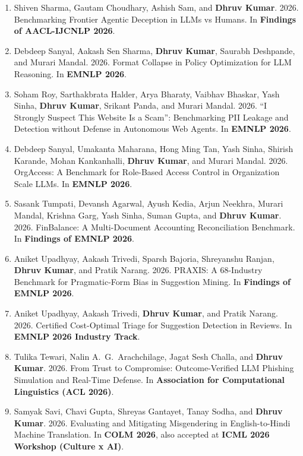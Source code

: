 \documentclass[10pt, a4paper]{article}
\begin{document}
\begin{enumerate}[label=\textbf{C\arabic*.}, leftmargin=2.8em, itemsep=0.3em]
\item Shiven Sharma, Gautam Choudhary, Ashish Sam, and \textbf{Dhruv Kumar}. 2026. Benchmarking Frontier Agentic Deception in LLMs vs Humans. In \textbf{Findings of AACL-IJCNLP 2026}.

\item Debdeep Sanyal, Aakash Sen Sharma, \textbf{Dhruv Kumar}, Saurabh Deshpande, and Murari Mandal. 2026. Format Collapse in Policy Optimization for LLM Reasoning. In \textbf{EMNLP 2026}.

\item Soham Roy, Sarthakbrata Halder, Arya Bharaty, Vaibhav Bhaskar, Yash Sinha, \textbf{Dhruv Kumar}, Srikant Panda, and Murari Mandal. 2026. ``I Strongly Suspect This Website Is a Scam'': Benchmarking PII Leakage and Detection without Defense in Autonomous Web Agents. In \textbf{EMNLP 2026}.

\item Debdeep Sanyal, Umakanta Maharana, Hong Ming Tan, Yash Sinha, Shirish Karande, Mohan Kankanhalli, \textbf{Dhruv Kumar}, and Murari Mandal. 2026. OrgAccess: A Benchmark for Role-Based Access Control in Organization Scale LLMs. In \textbf{EMNLP 2026}.

\item Sasank Tumpati, Devansh Agarwal, Ayush Kedia, Arjun Neekhra, Murari Mandal, Krishna Garg, Yash Sinha, Suman Gupta, and \textbf{Dhruv Kumar}. 2026. FinBalance: A Multi-Document Accounting Reconciliation Benchmark. In \textbf{Findings of EMNLP 2026}.

\item Aniket Upadhyay, Aakash Trivedi, Sparsh Bajoria, Shreyanshu Ranjan, \textbf{Dhruv Kumar}, and Pratik Narang. 2026. PRAXIS: A 68-Industry Benchmark for Pragmatic-Form Bias in Suggestion Mining. In \textbf{Findings of EMNLP 2026}.

\item Aniket Upadhyay, Aakash Trivedi, \textbf{Dhruv Kumar}, and Pratik Narang. 2026. Certified Cost-Optimal Triage for Suggestion Detection in Reviews. In \textbf{EMNLP 2026 Industry Track}.

\item Tulika Tewari, Nalin A.\ G.\ Arachchilage, Jagat Sesh Challa, and \textbf{Dhruv Kumar}. 2026. From Trust to Compromise: Outcome-Verified LLM Phishing Simulation and Real-Time Defense. In \textbf{Association for Computational Linguistics (ACL 2026)}.

\item Samyak Savi, Chavi Gupta, Shreyas Gantayet, Tanay Sodha, and \textbf{Dhruv Kumar}. 2026. Evaluating and Mitigating Misgendering in English-to-Hindi Machine Translation. In \textbf{COLM 2026}, also accepted at \textbf{ICML 2026 Workshop (Culture x AI)}.


\end{enumerate}
\end{document}
